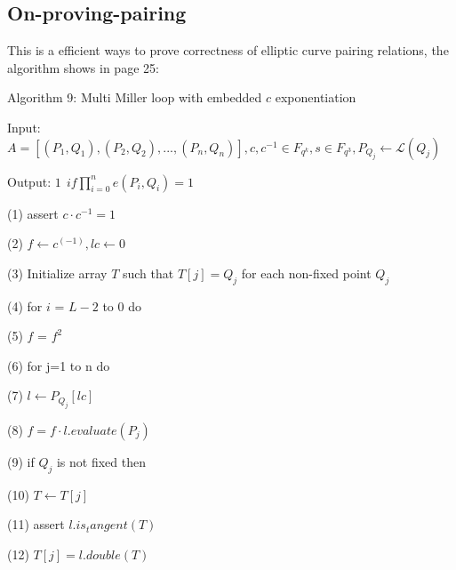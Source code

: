 \subsection{On-proving-pairing}

This is a efficient ways to prove correctness of elliptic curve pairing relations, the algorithm shows in page 25:

Algorithm 9: Multi Miller loop with embedded $c$ exponentiation \newline

Input: $\displaystyle A = [(P_1,Q_1), (P_2,Q_2),...,(P_n,Q_n)],c, c^{-1} \in F_{q^k},s \in F_{q^3},P_{Q_j} \leftarrow \mathcal{L}(Q_j)$ \newline

Output: $\displaystyle 1 \ \ if \prod_{i=0}^{n}e(P_i, Q_i) = 1 $ \newline

(1) assert $\displaystyle c \cdot c^{-1} = 1 $ \newline

(2) $\displaystyle f \leftarrow c^(-1), lc \leftarrow 0 $ \newline

(3) Initialize array $T$ such that $\displaystyle T[j] = Q_j $ for each non-fixed point $Q_j$ \newline

(4) for $i$ = $L-2$ to $0$ do \newline

(5) \indent $f$ = $f^2$ \newline

(6) \indent for j=1 to n do \newline

(7) \indent \indent $\displaystyle l \leftarrow P_{Q_j}[lc] $ \newline

(8) \indent \indent $\displaystyle f = f \cdot l.evaluate(P_j) $ \newline 

(9) \indent \indent if $Q_j$ is not fixed then \newline

(10) \indent \indent \indent $\displaystyle T \leftarrow T[j] $ \newline

(11) \indent \indent \indent assert $\displaystyle l.is_tangent(T) $ \newline

(12) \indent \indent \indent $\displaystyle T[j] = l.double(T) $ \newline

